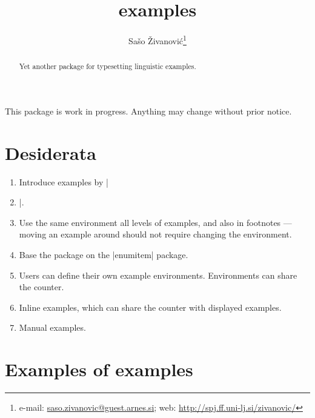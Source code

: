 \documentclass[a4paper]{ltxdoc}
\author{Sašo Živanović\footnote{%
    e-mail: \href{mailto:saso.zivanovic@guest.arnes.si}{saso.zivanovic@guest.arnes.si};
    web: \href{http://spj.ff.uni-lj.si/zivanovic/}{http://spj.ff.uni-lj.si/zivanovic/}}}
\title{examples}
\begin{document}
\maketitle

\begin{abstract}
  Yet another package for typesetting linguistic examples.
\end{abstract}

This package is work in progress. Anything may change without prior notice.

\section{Desiderata}

\newcommand\done{Checkedbox}
\begin{enumerate}[label=\todobox]
\item[\donebox] Introduce examples by |\item|.
\item[\donebox] Use the same environment all levels of examples, and also in footnotes
  --- moving an example around should not require changing the environment.
\item[\donebox] Base the package on the |enumitem| package.
\item[\donebox] Users can define their own example environments.  Environments can share
  the counter.
\item[\donebox] Inline examples, which can share the counter with displayed examples.
\item Manual examples.
\end{enumerate}

\section{Examples of examples}
\end{document}
